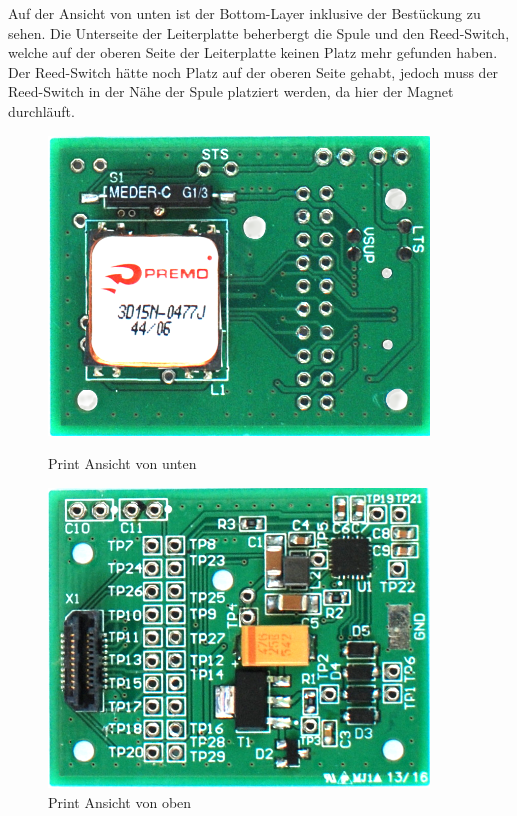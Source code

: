 Auf der Ansicht von unten ist der Bottom-Layer inklusive der Bestückung zu sehen. Die Unterseite der Leiterplatte beherbergt die Spule und den Reed-Switch, welche auf der oberen Seite der Leiterplatte keinen Platz mehr gefunden haben. Der Reed-Switch hätte noch Platz auf der oberen Seite gehabt, jedoch muss der Reed-Switch in der Nähe der Spule platziert werden, da hier der Magnet durchläuft.

\begin{figure}[ht]
 \begin{minipage}[t]{0.5\textwidth}
    \includegraphics[width=0.9\textwidth]{4Resultate/imag/print_rueckseite.png} 
    \caption{Print Ansicht von unten}
    \label{print_rueckseite}
 \end{minipage}
 \begin{minipage}[t]{0.5\textwidth}
    \includegraphics[width=0.9\textwidth]{4Resultate/imag/print_vorne.png} 
    \caption{Print Ansicht von oben}
    \label{print_vorne}
 \end{minipage}
\end{figure}

